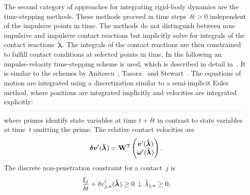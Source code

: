 \documentclass[global,twocolumn]{svjour}
\let\vec\bm
\newcommand{\compl}{~\bot~}
\newcommand{\vectoscalar}[1]{{\renewcommand{\vec}{}#1}}
\newcommand{\dt}{\ensuremath{\delta t}}
\newcommand{\mat}[1]{{\bf #1}}
\newcommand{\dvect}[2]{\ensuremath{\begin{pmatrix}#1\\#2\end{pmatrix}}}
\newcommand{\transp}{{\mathrm{T}}}
\newcommand{\cross}{\times}
\newcommand{\pos}    [1]{\ensuremath{\vec{x}_{#1}}}
\newcommand{\orient} [1]{\ensuremath{\vec{\varphi}_{#1}}}
\newcommand{\linvel} [1]{\ensuremath{\vec{v}_{#1}}}
\newcommand{\angvel} [1]{\ensuremath{\vec{\omega}_{#1}}}
\newcommand{\inertia}[1]{\ensuremath{\mat{I}_{#1}}}
\newcommand{\forceextapprox} [1]{\ensuremath{\vec{\tilde{f}}_{\ifstrequal{#1}{}{ext}{#1,ext}}}}
\newcommand{\torqueextapprox}[1]{\ensuremath{\vec{\tilde{\tau}}_{\ifstrequal{#1}{}{ext}{#1,ext}}}}
\newcommand{\contactforceapprox}[1]{\ensuremath{\vec{\tilde{\lambda}}_{#1}}}
\newcommand{\contactforceapproxCFn}[1]{\ensuremath{\vectoscalar{\contactforceapprox{\ifstrequal{#1}{}{n}{#1,n}}}}}
\newcommand{\primerelvel}[1]{\ensuremath{{\vec{\delta v}_{#1}'}}}
\newcommand{\primerelvelCFn}[1]{\ensuremath{\vectoscalar{\primerelvel{\ifstrequal{#1}{}{n}{#1,n}}}}}
\newcommand{\shrinkeqnnew}[2]{\resizebox{#1\linewidth}{!}{\begin{varwidth}[t]{2\linewidth}\ensuremath{\displaystyle{#2}}\end{varwidth}}}
\begin{document}
			The second category of approaches for integrating rigid-body dynamics
			are the time-stepping methods. These methods proceed in time
			steps~$\dt > 0$ independent of the impulsive points in time.
			The methods do not distinguish between non-impulsive and
			impulsive contact reactions but implicitly solve for integrals of
			the contact reactions~$\contactforceapprox{}$. The integrals of the contact reactions are
			then constrained to fulfill contact conditions at selected points
			in time. In the following an impulse-velocity time-stepping
			scheme is used, which is described in detail in~\cite{preclik14}. It is similar to the
			schemes by Anitescu~\cite{anitescu97}, Tasora~\cite{tasora11} and
			Stewart~\cite{stewart96}. The equations of motion are integrated
			using a discretization similar to a semi-implicit Euler method,
			where positions are integrated implicitly and velocities are
			integrated explicitly:
			\begin{equation*}
			\shrinkeqnnew{1}{
				\begin{split}
					\pos{}'(\contactforceapprox{})    & = \pos{}    + \dt \linvel{}'(\contactforceapprox{}), \\
					\orient{}'(\contactforceapprox{}) & = \sfrac{\left(\orient{} + \dt \mat{Q}(\orient{}) \angvel{}'(\contactforceapprox{})\right)}{\norm{\orient{} + \dt \mat{Q}(\orient{}) \angvel{}'(\contactforceapprox{})}_2}, \\
					\dvect{\linvel{}'(\contactforceapprox{})}{\angvel{}'(\contactforceapprox{})} & = \dvect{\linvel{}}{\angvel{}} + \mat{M}(\orient{})^{-1} \left( \mat{W} \contactforceapprox{} + \dvect{\forceextapprox{}}{\torqueextapprox{} - \dt \angvel{} \cross \inertia{}(\orient{}) \angvel{}} \right),
				\end{split}
			}
			\end{equation*}
			where primes identify state variables at time $t + \dt$ in contrast to
			state variables	at time~$t$ omitting the prime. The relative contact
			velocities are
			\begin{equation*}
				\primerelvel{}(\contactforceapprox{}) = \mat{W}^\transp \dvect{\linvel{}'(\contactforceapprox{})}{\angvel{}'(\contactforceapprox{})}.
			\end{equation*}
			The discrete non-penetration constraint for a contact~$j$ is
			\begin{equation*}
				\frac{\xi_j}{\dt} + \primerelvelCFn{j}(\contactforceapprox{}) \geq 0 \compl \contactforceapproxCFn{j} \geq 0,
			\end{equation*}
\end{document}
